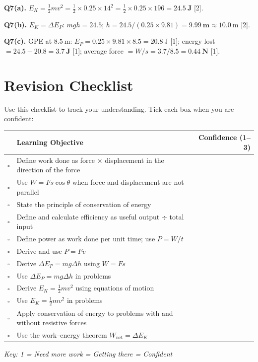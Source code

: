 \begin{markscheme}
\vspace{0.5em}\textbf{Q7(a).} $E_K = \tfrac{1}{2}mv^2 = \tfrac{1}{2}\times0.25\times14^2 = \tfrac{1}{2}\times0.25\times196 = \mathbf{24.5\ \text{J}}$ [2].

\vspace{0.5em}\textbf{Q7(b).} $E_K = \Delta E_P$: $mgh = 24.5$; $h = 24.5/(0.25\times9.81) = \mathbf{9.99\ \text{m}} \approx 10.0\ \text{m}$ [2].

\vspace{0.5em}\textbf{Q7(c).} GPE at $8.5\ \text{m}$: $E_P = 0.25\times9.81\times8.5 = 20.8\ \text{J}$ [1]; energy lost $= 24.5 - 20.8 = \mathbf{3.7\ \text{J}}$ [1]; average force $= W/s = 3.7/8.5 = \mathbf{0.44\ \text{N}}$ [1].

\end{markscheme}

\newpage
\section{Revision Checklist}

Use this checklist to track your understanding. Tick each box when you are confident:

\begin{tcolorbox}[colback=white, colframe=darkblue, breakable]
\renewcommand{\arraystretch}{1.5}
\begin{tabular}{@{} c p{10.5cm} r @{}}
\toprule
 & \textbf{Learning Objective} & \textbf{Confidence (1--3)} \\
\midrule
$\square$ & Define work done as force $\times$ displacement in the direction of the force & \\
$\square$ & Use $W = Fs\cos\theta$ when force and displacement are not parallel & \\
$\square$ & State the principle of conservation of energy & \\
$\square$ & Define and calculate efficiency as useful output $\div$ total input & \\
$\square$ & Define power as work done per unit time; use $P = W/t$ & \\
$\square$ & Derive and use $P = Fv$ & \\
$\square$ & Derive $\Delta E_P = mg\Delta h$ using $W = Fs$ & \\
$\square$ & Use $\Delta E_P = mg\Delta h$ in problems & \\
$\square$ & Derive $E_K = \tfrac{1}{2}mv^2$ using equations of motion & \\
$\square$ & Use $E_K = \tfrac{1}{2}mv^2$ in problems & \\
$\square$ & Apply conservation of energy to problems with and without resistive forces & \\
$\square$ & Use the work--energy theorem $W_{\text{net}} = \Delta E_K$ & \\
\bottomrule
\end{tabular}
\vspace{0.5em}

\textit{Key: 1 = Need more work  = Getting there  = Confident}
\end{tcolorbox}

